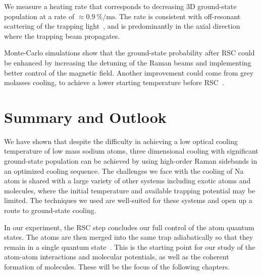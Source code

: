 We measure a heating rate that corresponds to decreasing 3D ground-state population
at a rate of $\approx\!0.9~\mathrm{\%/ms}$.
The rate is consistent with off-resonant scattering of
the trapping light~\cite{grimm_optical_2000},
and is predominantly in the axial direction where the trapping beam propagates.

Monte-Carlo simulations show that the ground-state probability after RSC
could be enhanced by increasing the detuning of the Raman beams and implementing
better control of the magnetic field. Another improvement could come from
grey molasses cooling,
to achieve a lower starting temperature before RSC~\cite{colzi_sub-doppler_2016}.

\section{Summary and Outlook}
\label{ch:rsc:summary}

We have shown that despite the difficulty in achieving a low optical cooling temperature
of low mass sodium atoms, three dimensional cooling
with significant ground-state population can be achieved
by using high-order Raman sidebands in an optimized cooling sequence.
The challenges we face with the cooling of Na atom is shared with
a large variety of other systems including exotic atoms and molecules,
where the initial temperature and available trapping potential may be limited.
The techniques we used are well-suited for these systems
and open up a route to ground-state cooling.

In our experiment, the RSC step concludes our full control of the atom quantum states.
The atoms are then merged into the same trap adiabatically
so that they remain in a single quantum state~\cite{liu_molecular_2019}.
This is the starting point for our study of
the atom-atom interactions and molecular potentials,
as well as the coherent formation of molecules.
These will be the focus of the following chapters.
